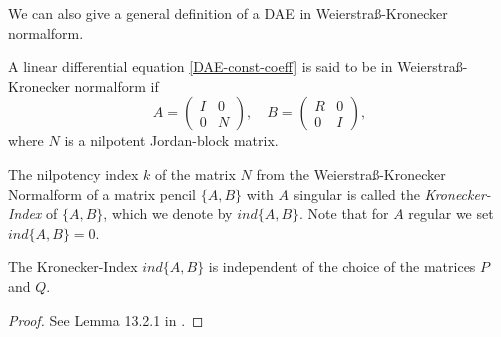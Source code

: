 We can also give a general definition of a DAE in Weierstraß-Kronecker normalform.
\begin{definition}
	A linear differential equation \eqref{DAE-const-coeff} is said to be in Weierstraß-Kronecker normalform if
	\begin{displaymath}
		A = 
		\left(
		\begin{matrix}
			I & 0 \\
			0 & N
		\end{matrix}
		\right), \quad
		B = 
		\left(
		\begin{matrix}
			R & 0 \\
			0 & I
		\end{matrix}
		\right),
	\end{displaymath}
	where $N$ is a nilpotent Jordan-block matrix.
\end{definition}

\begin{definition}
	The nilpotency index $k$ of the matrix $N$ from the Weierstraß-Kronecker Normalform of a matrix pencil $\{A,B\}$ with $A$ singular is called the \emph{Kronecker-Index} of $\{A,B\}$, which we denote by $ind\{A,B\}$. Note that for $A$ regular we set $ind\{A,B\} = 0$.
\end{definition}


\begin{lemma}
	\label{Lemma:indipendence of Kronecker index}
	The Kronecker-Index $ind\{A,B\}$ is independent of the choice of the matrices $P$ and $Q$.
\end{lemma}

\begin{proof}
	See Lemma 13.2.1 in .
\end{proof}







